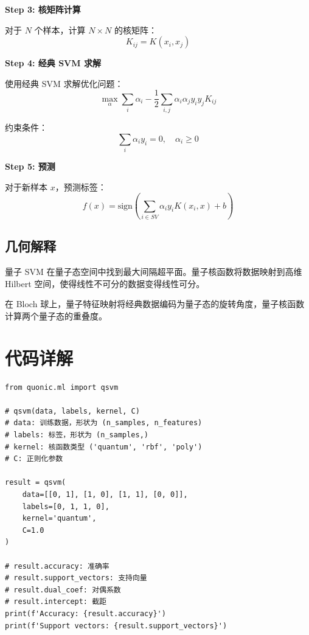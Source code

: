 \documentclass[12pt,a4paper]{article}
\begin{document}
\textbf{Step 3: 核矩阵计算}

对于 $N$ 个样本，计算 $N \times N$ 的核矩阵：
\begin{equation}
K_{ij} = K(x_i, x_j)
\end{equation}

\textbf{Step 4: 经典 SVM 求解}

使用经典 SVM 求解优化问题：
\begin{equation}
\max_\alpha \sum_i \alpha_i - \frac{1}{2} \sum_{i,j} \alpha_i \alpha_j y_i y_j K_{ij}
\end{equation}

约束条件：
\begin{equation}
\sum_i \alpha_i y_i = 0, \quad \alpha_i \geq 0
\end{equation}

\textbf{Step 5: 预测}

对于新样本 $x$，预测标签：
\begin{equation}
f(x) = \text{sign}\left(\sum_{i \in SV} \alpha_i y_i K(x_i, x) + b\right)
\end{equation}

\subsection{几何解释}

量子 SVM 在量子态空间中找到最大间隔超平面。量子核函数将数据映射到高维 Hilbert 空间，使得线性不可分的数据变得线性可分。

在 Bloch 球上，量子特征映射将经典数据编码为量子态的旋转角度，量子核函数计算两个量子态的重叠度。

\section{代码详解}

\begin{verbatim}
from quonic.ml import qsvm

# qsvm(data, labels, kernel, C)
# data: 训练数据，形状为 (n_samples, n_features)
# labels: 标签，形状为 (n_samples,)
# kernel: 核函数类型 ('quantum', 'rbf', 'poly')
# C: 正则化参数

result = qsvm(
    data=[[0, 1], [1, 0], [1, 1], [0, 0]],
    labels=[0, 1, 1, 0],
    kernel='quantum',
    C=1.0
)

# result.accuracy: 准确率
# result.support_vectors: 支持向量
# result.dual_coef: 对偶系数
# result.intercept: 截距
print(f'Accuracy: {result.accuracy}')
print(f'Support vectors: {result.support_vectors}')
\end{verbatim}
\end{document}
